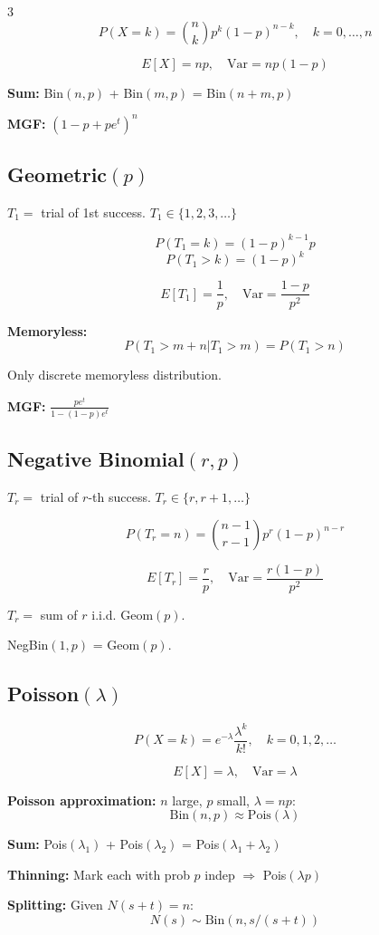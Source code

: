 \documentclass[10pt,landscape]{article}
\begin{document}
\begin{multicols}{3}
$$P(X = k) = \binom{n}{k} p^k (1-p)^{n-k}, \quad k = 0, \ldots, n$$

$$E[X] = np, \quad \text{Var} = np(1-p)$$

\textbf{Sum:} Bin$(n,p)$ + Bin$(m,p)$ = Bin$(n+m,p)$

\textbf{MGF:} $(1 - p + pe^t)^n$

\subsection{Geometric$(p)$}
$T_1 = $ trial of 1st success. $T_1 \in \{1, 2, 3, \ldots\}$

$$P(T_1 = k) = (1-p)^{k-1} p$$
$$P(T_1 > k) = (1-p)^k$$

$$E[T_1] = \frac{1}{p}, \quad \text{Var} = \frac{1-p}{p^2}$$

\textbf{Memoryless:}
$$P(T_1 > m + n | T_1 > m) = P(T_1 > n)$$

Only discrete memoryless distribution.

\textbf{MGF:} $\frac{pe^t}{1 - (1-p)e^t}$

\subsection{Negative Binomial$(r, p)$}
$T_r = $ trial of $r$-th success. $T_r \in \{r, r+1, \ldots\}$

$$P(T_r = n) = \binom{n-1}{r-1} p^r (1-p)^{n-r}$$

$$E[T_r] = \frac{r}{p}, \quad \text{Var} = \frac{r(1-p)}{p^2}$$

$T_r = $ sum of $r$ i.i.d. Geom$(p)$.

NegBin$(1, p)$ = Geom$(p)$.

\subsection{Poisson$(\lambda)$}
$$P(X = k) = e^{-\lambda} \frac{\lambda^k}{k!}, \quad k = 0, 1, 2, \ldots$$

$$E[X] = \lambda, \quad \text{Var} = \lambda$$

\textbf{Poisson approximation:} $n$ large, $p$ small, $\lambda = np$:
$$\text{Bin}(n, p) \approx \text{Pois}(\lambda)$$

\textbf{Sum:} Pois$(\lambda_1)$ + Pois$(\lambda_2)$ = Pois$(\lambda_1 + \lambda_2)$

\textbf{Thinning:} Mark each with prob $p$ indep $\Rightarrow$ Pois$(\lambda p)$

\textbf{Splitting:} Given $N(s+t) = n$:
$$N(s) \sim \text{Bin}(n, s/(s+t))$$


\end{multicols}
\end{document}
